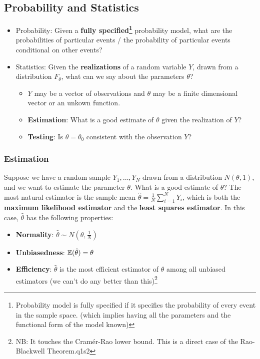 \subsection{Probability and Statistics}


\begin{itemize}
    \item Probability: Given a \textbf{fully specified\footnote{Probability model is fully specified if it specifies the probability of every event in the sample space. (which implies having all the parameters and the functional form of the model known)}} probability model, what are the probabilities of particular events / the probability of particular events conditional on other events?
    \item Statistics: Given the \textbf{realizations} of a random variable $Y$, drawn from a distribution $F_\theta$, what can we say about the parameters $\theta$?
    \begin{itemize}
        \item $Y$ may be a vector of observations and $\theta$ may be a finite dimensional vector or an unkown function.
        \item \textbf{Estimation}: What is a good estimate of $\theta$ given the realization of $Y$?
        \item \textbf{Testing}: Is $\theta = \theta_0$ consistent with the observation $Y$?
    \end{itemize}
\end{itemize}

\subsubsection{Estimation}

Suppose we have a random sample $Y_1, \ldots, Y_N$ drawn from a distribution $N(\theta, 1)$, and we want to estimate the parameter $\theta$.
What is a good estimate of $\theta$? The most natural estimator is the sample mean $\hat{\theta} = \frac{1}{N}\sum_{i=1}^N Y_i$, which is both the \textbf{maximum likelihood estimator} and the \textbf{least squares estimator}.
In this case, $\hat{\theta}$ has the following properties:

\begin{itemize}
    \item \textbf{Normality}: $\hat{\theta} \sim N(\theta, \frac{1}{N})$
    \item \textbf{Unbiasedness}: ${\mathbb{E}}(\hat{\theta}) = \theta$
    \item \textbf{Efficiency}: $\hat{\theta}$ is the most efficient estimator of $\theta$ among all unbiased estimators (we can't do any better than this)\footnote{NB: It touches the Cramér-Rao lower bound. This is a direct case of the Rao-Blackwell Theorem.q1s2}
\end{itemize}


